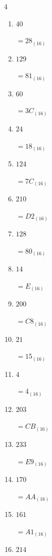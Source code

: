 \begin{multicols}{4}
\begin{enumerate}
        $=F4_{(16)}$

  \item $40$

        $=28_{(16)}$

  \item $129$

        $=81_{(16)}$

  \item $60$

        $=3C_{(16)}$

  \item $24$

        $=18_{(16)}$

  \item $124$

        $=7C_{(16)}$

  \item $210$

        $=D2_{(16)}$

  \item $128$

        $=80_{(16)}$

  \item $14$

        $=E_{(16)}$

  \item $200$

        $=C8_{(16)}$

  \item $21$

        $=15_{(16)}$

  \item $4$

        $=4_{(16)}$

  \item $203$

        $=CB_{(16)}$

  \item $233$

        $=E9_{(16)}$

\columnbreak %

\resetques

  \item $170$

        $=AA_{(16)}$

  \item $161$

        $=A1_{(16)}$

  \item $214$


\end{enumerate}
\end{multicols}
